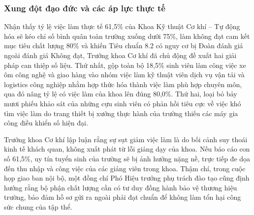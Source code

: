 \subsubsection{Xung đột đạo đức và các áp lực thực tế}

Nhận thấy tỷ lệ việc làm thực tế 61,5\% của Khoa Kỹ thuật Cơ khí -- Tự động hóa sẽ kéo chỉ số bình quân toàn trường xuống dưới 75\%, làm không đạt cam kết mục tiêu chất lượng 80\% và khiến Tiêu chuẩn 8.2 có nguy cơ bị Đoàn đánh giá ngoài đánh giá Không đạt, Trưởng khoa Cơ khí đã chủ động đề xuất hai giải pháp can thiệp số liệu. Thứ nhất, gộp toàn bộ 18,5\% sinh viên làm công việc xe ôm công nghệ và giao hàng vào nhóm việc làm kỹ thuật viên dịch vụ vận tải và logistics công nghiệp nhằm hợp thức hóa thành việc làm phù hợp chuyên môn, qua đó nâng tỷ lệ có việc làm của khoa lên đúng 80,0\%. Thứ hai, loại bỏ bảy mươi phiếu khảo sát của những cựu sinh viên có phản hồi tiêu cực về việc khó tìm việc làm do trang thiết bị xưởng thực hành của trường thiếu các máy gia công điều khiển số hiện đại.

Trưởng khoa Cơ khí lập luận rằng sự sụt giảm việc làm là do bối cảnh suy thoái kinh tế khách quan, không xuất phát từ lỗi giảng dạy của khoa. Nếu báo cáo con số 61,5\%, uy tín tuyển sinh của trường sẽ bị ảnh hưởng nặng nề, trực tiếp đe dọa đến thu nhập và công việc của các giảng viên trong khoa. Thậm chí, trong cuộc họp giao ban nội bộ, một đồng chí Phó Hiệu trưởng phụ trách đào tạo cũng định hướng rằng bộ phận chất lượng cần có tư duy đồng hành bảo vệ thương hiệu trường, bảo đảm hồ sơ gửi ra ngoài phải đạt chuẩn để không làm tổn hại công sức chung của tập thể.

